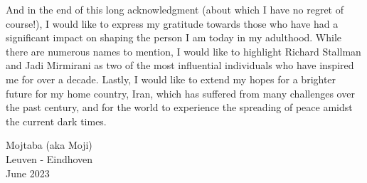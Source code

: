 And in the end of this long acknowledgment (about which I have no regret of course!), I would like to express my gratitude towards those who have had a significant impact on shaping the person I am today in my adulthood. While there are numerous names to mention, I would like to highlight Richard Stallman and Jadi Mirmirani as two of the most influential individuals who have inspired me for over a decade. Lastly, I would like to extend my hopes for a brighter future for my home country, Iran, which has suffered from many challenges over the past century, and for the world to experience the spreading of peace amidst the current dark times.

\begin{flushright}
Mojtaba (aka Moji)\\
Leuven - Eindhoven\\
June 2023
\end{flushright}



\cleardoublepage

